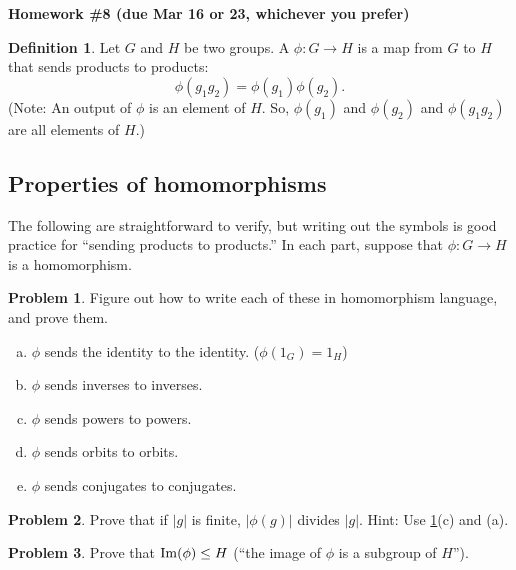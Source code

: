 \documentclass[12pt]{article}
\theoremstyle{definition} %
\newtheorem{problem}{Problem}
\newtheorem*{definition}{Definition}
\renewcommand{\section}[1]{\begin{center} \textbf{#1} \\\end{center}}
\begin{document}
\section{Homework \#8 (due Mar 16 or 23, whichever you prefer)} %

\begin{definition}
    Let $G$ and $H$ be two groups. A  $\phi:G\to H$ is a map from $G$ to $H$ that sends products to products:
    \[\phi(g_1 g_2) = \phi(g_1) \phi(g_2).\]
    (Note: An output of $\phi$ is an element of $H$. So, $\phi(g_1)$ and $\phi(g_2)$ and $\phi(g_1 g_2)$ are all elements of $H$.)
\end{definition}

\subsection*{Properties of homomorphisms}

The following are straightforward to verify, but writing out the symbols is good practice for ``sending products to products.'' In each part, suppose that $\phi:G\to H$ is a homomorphism.

\begin{problem}\label{properties}
    Figure out how to write each of these in homomorphism language, and prove them.
    \begin{enumerate}[(a)]
        \item $\phi$ sends the identity to the identity. ($\phi(1_G) = 1_H$)
        \item $\phi$ sends inverses to inverses.
        \item $\phi$ sends powers to powers.
        \item $\phi$ sends orbits to orbits.
        \item $\phi$ sends conjugates to conjugates.
    \end{enumerate}
\end{problem}

\begin{problem}\label{orders}
    Prove that if $|g|$ is finite, $|\phi(g)|$ divides $|g|$. Hint: Use \ref{properties}(c) and (a). 
\end{problem}

\begin{problem}
    Prove that $\operatorname{Im}(\phi) \leq H$ (``the image of $\phi$ is a subgroup of $H$'').
\end{problem}
\end{document}
